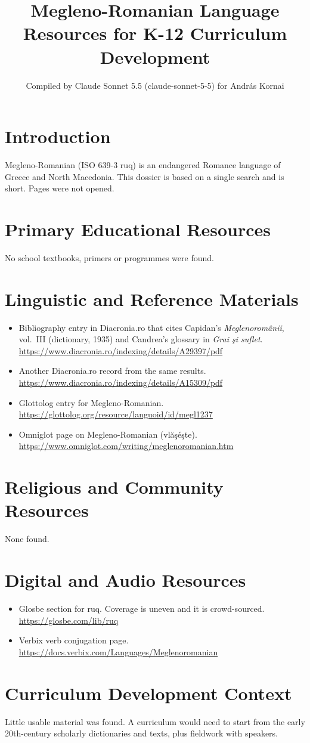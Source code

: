 \documentclass[12pt]{article}
\title{Megleno-Romanian Language Resources for K-12 Curriculum Development}
\author{Compiled by Claude Sonnet 5.5 (claude-sonnet-5-5) for Andr\'as Kornai}
\date{}
\begin{document}
\maketitle
\section{Introduction}
Megleno-Romanian (ISO 639-3 ruq) is an endangered Romance language of Greece and North Macedonia. This dossier is based on a single search and is short. Pages were not opened.

\section{Primary Educational Resources}
No school textbooks, primers or programmes were found.

\section{Linguistic and Reference Materials}
\begin{itemize}
\item Bibliography entry in Diacronia.ro that cites Capidan's \emph{Meglenorom\^anii}, vol.\ III (dictionary, 1935) and Candrea's glossary in \emph{Grai \c{s}i suflet}. \url{https://www.diacronia.ro/indexing/details/A29397/pdf}
\item Another Diacronia.ro record from the same results. \url{https://www.diacronia.ro/indexing/details/A15309/pdf}
\item Glottolog entry for Megleno-Romanian. \url{https://glottolog.org/resource/languoid/id/megl1237}
\item Omniglot page on Megleno-Romanian (vl\u{a}\c{s}\'e\c{s}te). \url{https://www.omniglot.com/writing/meglenoromanian.htm}
\end{itemize}

\section{Religious and Community Resources}
None found.

\section{Digital and Audio Resources}
\begin{itemize}
\item Glosbe section for ruq. Coverage is uneven and it is crowd-sourced. \url{https://glosbe.com/lib/ruq}
\item Verbix verb conjugation page. \url{https://docs.verbix.com/Languages/Meglenoromanian}
\end{itemize}

\section{Curriculum Development Context}
Little usable material was found. A curriculum would need to start from the early 20th-century scholarly dictionaries and texts, plus fieldwork with speakers.
\end{document}

